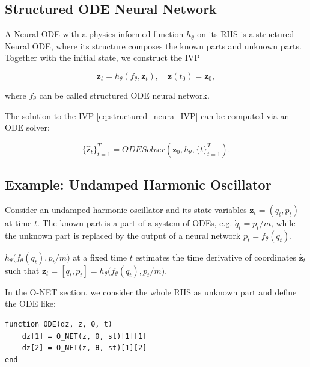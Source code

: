\documentclass[
	parskip, 			   %
	twoside, 			   %
	DIV=14, 			   %
	BCOR=15.0mm, 		   %
	headsepline, 		   %
	open=right, 		   %
	captions=tableheading, %
	bibliography=totoc,    %
	numbers=noenddot       %
]{scrreprt}
\begin{document}
\subsection{Structured ODE Neural Network}

A Neural ODE with a physics informed function $h_{\theta}$ on its RHS is a structured Neural ODE, where its structure composes the known parts and unknown parts. Together with the initial state, we construct the IVP

\begin{equation}
    \label{eq:structured_neura_IVP}
    \dot{\mathbf{z}}_t = h_{\theta}(f_{\theta}, \mathbf{z}_t), \quad \mathbf{z}(t_{0}) = \mathbf{z}_{0},
\end{equation}

where $f_{\theta}$ can be called structured ODE neural network.

The solution to the IVP \ref{eq:structured_neura_IVP} can be computed via an ODE solver:

\begin{equation}
    \label{eq:structured_O-NET_ODESolver}
        \{ \mathbf{\hat{z}}_{t} \}_{t=1}^{T} = ODESolver(\mathbf{z}_{0}, h_{\theta}, \{ t \}_{t=1}^{T}).
\end{equation}

\subsection{Example: Undamped Harmonic Oscillator}

Consider an undamped harmonic oscillator and its state variables $\mathbf{z}_t=(q_t, p_t)$ at time $t$. The known part is a part of a system of ODEs, e.g. $\dot{q}_t = p_t/m$, while the unknown part is replaced by the output of a neural network $\dot{p}_t = f_{\theta}(q_t)$. 

$h_{\theta} \big(f_{\theta}(q_t), p_t/m \big)$ at a fixed time $t$ estimates the time derivative of coordinates $\dot{\mathbf{z}_{t}}$ such that $\dot{\mathbf{z}_{t}} = [\dot{q}_{t}, \dot{p}_{t}] = h_{\theta} \big(f_{\theta}(q_t), p_t/m \big)$.

In the O-NET section, we consider the whole RHS as unknown part and define the ODE like:
\begin{verbatim}
function ODE(dz, z, θ, t)
    dz[1] = O_NET(z, θ, st)[1][1]
    dz[2] = O_NET(z, θ, st)[1][2]
end
\end{verbatim}
\end{document}

